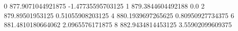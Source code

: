 0 877.9071044921875 -1.47735595703125
1 879.3844604492188 0.0
2 879.89501953125 0.51055908203125
4 880.1939697265625 0.80950927734375
6 881.4810180664062 2.0965576171875
8 882.9434814453125 3.55902099609375
